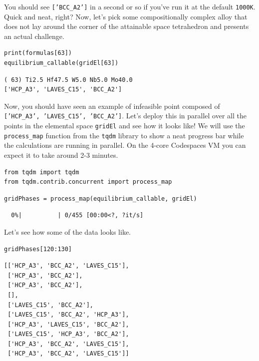You should see \texttt{['BCC\_A2']} in a second or so
if you've run it at the default \texttt{1000K}. Quick
and neat, right? Now, let's pick some compositionally complex alloy that
does not lay around the corner of the attainable space tetrahedron and
presents an actual challenge.

\begin{verbatim}
print(formulas[63])
equilibrium_callable(gridEl[63])
\end{verbatim}

\begin{verbatim}
( 63) Ti2.5 Hf47.5 W5.0 Nb5.0 Mo40.0 
['HCP_A3', 'LAVES_C15', 'BCC_A2']
\end{verbatim}

Now, you should have seen an example of infeasible point composed of
\texttt{['HCP\_A3', 'LAVES\_C15', 'BCC\_A2']}. Let's
deploy this in parallel over all the points in the elemental space
\texttt{gridEl} and see how it looks like! We will use
the \texttt{process\_map} function from the
\texttt{tqdm} library to show a neat progress bar while
the calculations are running in parallel. On the 4-core Codespaces VM
you can expect it to take around 2-3 minutes.

\begin{verbatim}
from tqdm import tqdm
from tqdm.contrib.concurrent import process_map
\end{verbatim}

\begin{verbatim}
gridPhases = process_map(equilibrium_callable, gridEl)
\end{verbatim}

\begin{verbatim}
  0%|          | 0/455 [00:00<?, ?it/s]
\end{verbatim}

Let's see how some of the data looks like.

\begin{verbatim}
gridPhases[120:130]
\end{verbatim}

\begin{verbatim}
[['HCP_A3', 'BCC_A2', 'LAVES_C15'],
 ['HCP_A3', 'BCC_A2'],
 ['HCP_A3', 'BCC_A2'],
 [],
 ['LAVES_C15', 'BCC_A2'],
 ['LAVES_C15', 'BCC_A2', 'HCP_A3'],
 ['HCP_A3', 'LAVES_C15', 'BCC_A2'],
 ['LAVES_C15', 'HCP_A3', 'BCC_A2'],
 ['HCP_A3', 'BCC_A2', 'LAVES_C15'],
 ['HCP_A3', 'BCC_A2', 'LAVES_C15']]
\end{verbatim}

